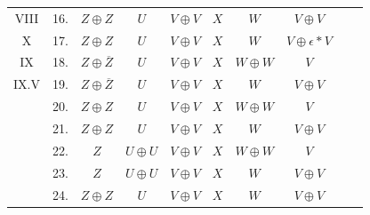 \begin{table}[p]
\begin{tabular}{c r c c c c c c c c}
VIII & 16. &  $Z \oplus Z$ & $U$ & $V \oplus V$ & $X$ & $W$ & $V \oplus V$  \\ 
X & 17. &  $Z \oplus Z$ & $U$ & $V \oplus V$ & $X$ & $W$ & $V \oplus \epsilon * V$  \\ 
IX & 18. &  $Z \oplus \overline{Z}$ & $U$ & $V \oplus V$ & $X$ & $W \oplus W$ & $V$ \\ 
IX.V & 19. &  $Z \oplus \overline{Z}$ & $U$ & $V \oplus V$ & $X$ & $W$ & $V \oplus V$ \\ 
& 20. &  $Z \oplus Z$ & $U$ & $V \oplus V$ & $X$ & $W \oplus W$ & $V$ \\ 
& 21. &  $Z \oplus Z$ & $U$ & $V \oplus V$ & $X$ & $W$ & $V \oplus V$  \\ 
& 22. &  $Z$ & $U \oplus U$ & $V \oplus V$ & $X$ & $W \oplus W$ & $V$  \\ 
& 23. &  $Z$ & $U \oplus U$ & $V \oplus V$ & $X$ & $W$ & $V \oplus V$  \\ 
& 24. &  $Z \oplus Z$ & $U$ & $V \oplus V$ & $X$ & $W$ & $V \oplus V$ \\ 
\bottomrule
\end{tabular}
\egroup
\end{table}

